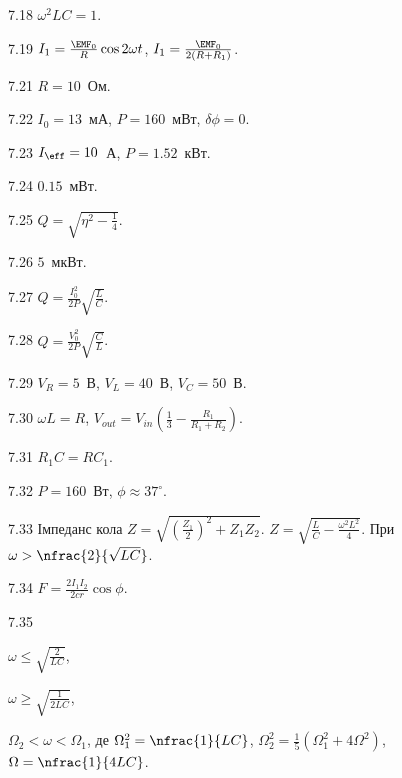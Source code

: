 \begin{Solution}{7.{18}}
	$\omega^2LC = 1$.
\end{Solution}
\begin{Solution}{7.{19}}
	$I_1 = \frac{\EMF_0}{R}\cos 2\omega t$, $I_1 = \frac{\EMF_0}{2(R + R_1)}$.
\end{Solution}
\begin{Solution}{7.{21}}
    $R = 10$~Ом.
\end{Solution}
\begin{Solution}{7.{22}}
    $I_0 = 13$~мА, $P = 160$~мВт, $\delta\phi = 0$.
\end{Solution}
\begin{Solution}{7.{23}}
    $I_{\eff} = 10$~А, $P = 1.52$~кВт.
\end{Solution}
\begin{Solution}{7.{24}}
    $0.15$~мВт.
\end{Solution}
\begin{Solution}{7.{25}}
    $Q = \sqrt{\eta^2 - \frac14}$.
\end{Solution}
\begin{Solution}{7.{26}}
    $5$~мкВт.
\end{Solution}
\begin{Solution}{7.{27}}
    $Q = \frac{I_0^2}{2P}\sqrt{\frac{L}{C}}$.
\end{Solution}
\begin{Solution}{7.{28}}
    $Q = \frac{V_0^2}{2P}\sqrt{\frac{C}{L}}$.
\end{Solution}
\begin{Solution}{7.{29}}
    $V_R = 5$~В, $V_L = 40$~В, $V_C = 50$~В.
\end{Solution}
\begin{Solution}{7.{30}}
	$\omega L = R$, $V_{out} = V_{in} \left( \frac13 - \frac{R_1}{R_1 + R_2}\right) $.
\end{Solution}
\begin{Solution}{7.{31}}
	$R_1C = RC_1$.
\end{Solution}
\begin{Solution}{7.{32}}
	$P = 160$~Вт, $\phi \approx 37^\circ$.
\end{Solution}
\begin{Solution}{7.{33}}
	Імпеданс кола $Z = \sqrt{\left( \frac{Z_1}{2}\right)^2 + Z_1Z_2}$.
	$Z = \sqrt{\frac{L}{C} - \frac{\omega^2L^2}{4}}$. При $\omega > \nfrac{2}{\sqrt{LC}}$.
\end{Solution}
\begin{Solution}{7.{34}}
	$F = \frac{2I_1I_2}{2cr}\cos\phi$.
\end{Solution}
\begin{Solution}{7.{35}}
	\begin{enumerate*}[label=\alph*)]
		\item $\omega \le \sqrt{\frac{2}{LC}}$,
		\item $\omega \ge \sqrt{\frac{1}{2LC}}$,
		\item $\Omega_2 < \omega < \Omega_1$, де $\Omega_1^2 = \nfrac{1}{LC} $, $\Omega_2^2 = \frac15 \left( \Omega_1^2 + 4\Omega^2\right)  $, $\Omega = \nfrac{1}{4LC}$.
	\end{enumerate*}
\end{Solution}
